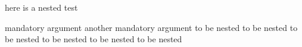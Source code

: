 here is a nested test
\begin{one}{mandatory argument} {another mandatory argument}
	to be nested to be nested
	to be nested to be nested
	to be nested to be nested
\end{one}
